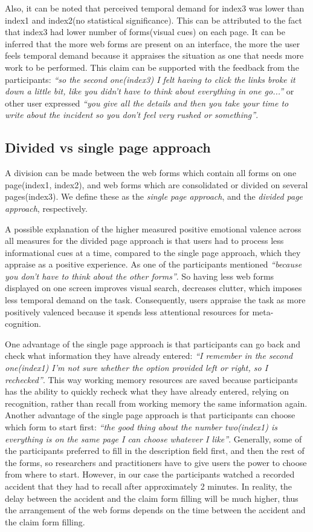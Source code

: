 \documentclass[a4paper]{report}
\begin{document}
			Also, it can be noted that perceived temporal demand for index3 was lower than index1 and index2(no statistical significance). This can be attributed to the fact that index3 had lower number of forms(visual cues) on each page. It can be inferred that the more web forms are present on an interface, the more the user feels temporal demand because it appraises the situation as one that needs more work to be performed. This claim can be supported with the feedback from the participants: \textit{``so the second one(index3) I felt having to click the links broke it down a little bit, like you didn't have to think about everything in one go...''} or other user expressed \textit{``you give all the details and then you take your time to write about the incident so you don't feel very rushed or something''}. 
				
		\subsection{Divided vs single page approach}
			A division can be made between the web forms which contain all forms on one page(index1, index2), and web forms which are consolidated or divided on several pages(index3). We define these as the \textit{single page approach}, and the \textit{divided page approach}, respectively.
		
			A possible explanation of the higher measured positive emotional valence across all measures for the divided page approach is that users had to process less informational cues at a time, compared to the single page approach, which they appraise as a positive experience. As one of the participants mentioned \textit{``because you don't have to think about the other forms''}. So having less web forms displayed on one screen improves visual search, decreases clutter, which imposes less temporal demand on the task. Consequently, users appraise the task as more positively valenced because it spends less attentional resources for meta-cognition.
		
			One advantage of the single page approach is that participants can go back and check what information they have already entered: \textit{``I remember in the second one(index1) I'm not sure whether the option provided left or right, so I rechecked''}. This way working memory resources are saved because participants has the ability to quickly recheck what they have already entered, relying on recognition, rather than recall\cite{nielsen1990heuristic} from working memory the same information again. Another advantage of the single page approach is that participants can choose which form to start first: \textit{``the good thing about the number two(index1) is everything is on the same page I can choose whatever I like''}. Generally, some of the participants preferred to fill in the description field first, and then the rest of the forms, so researchers and practitioners have to give users the power to choose from where to start. However, in our case the participants watched a recorded accident that they had to recall after approximately 2 minutes. In reality, the delay between the accident and the claim form filling will be much higher, thus the arrangement of the web forms depends on the time between the accident and the claim form filling.
		
\end{document}
